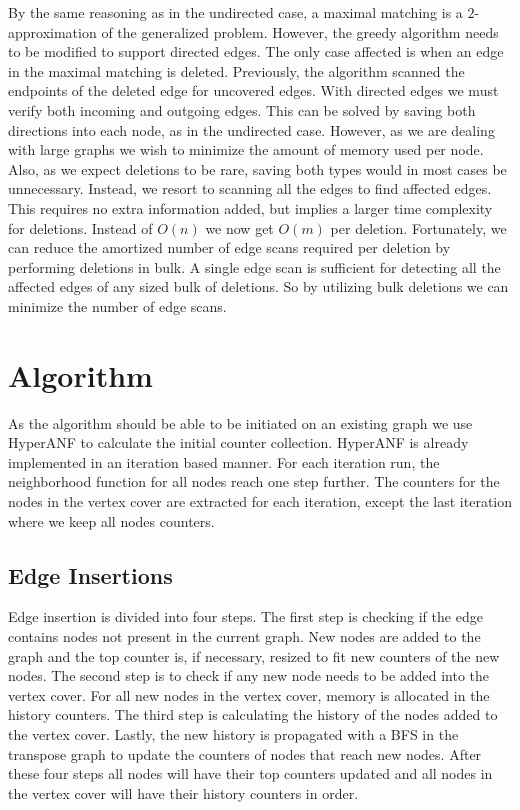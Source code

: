 By the same reasoning as in the undirected case, a maximal matching is a $2$-approximation of the generalized problem. However, the greedy algorithm needs to be modified to support directed edges. The only case affected is when an edge in the maximal matching is deleted. Previously, the algorithm scanned the endpoints of the deleted edge for uncovered edges. With directed edges we must verify both incoming and outgoing edges. This can be solved by saving both directions into each node, as in the undirected case. However, as we are dealing with large graphs we wish to minimize the amount of memory used per node. Also, as we expect deletions to be rare, saving both types would in most cases be unnecessary. Instead, we resort to scanning all the edges to find affected edges. This requires no extra information added, but implies a larger time complexity for deletions. Instead of $O(n)$ we now get $O(m)$ per deletion. Fortunately, we can reduce the amortized number of edge scans required per deletion by performing deletions in bulk. A single edge scan is sufficient for detecting all the affected edges of any sized bulk of deletions. So by utilizing bulk deletions we can minimize the number of edge scans.

\section{Algorithm}

As the algorithm should be able to be initiated on an existing graph we use HyperANF to calculate the initial counter collection. HyperANF is already implemented in an iteration based manner. For each iteration run, the neighborhood function for all nodes reach one step further. The counters for the nodes in the vertex cover are extracted for each iteration, except the last iteration where we keep all nodes counters. 

\subsection{Edge Insertions}

Edge insertion is divided into four steps. The first step is checking if the edge contains nodes not present in the current graph. New nodes are added to the graph and the top counter is, if necessary, resized to fit new counters of the new nodes. The second step is to check if any new node needs to be added into the vertex cover. For all new nodes in the vertex cover, memory is allocated in the history counters. The third step is calculating the history of the nodes added to the vertex cover. Lastly, the new history is propagated with a BFS in the transpose graph to update the counters of nodes that reach new nodes. After these four steps all nodes will have their top counters updated and all nodes in the vertex cover will have their history counters in order. 

